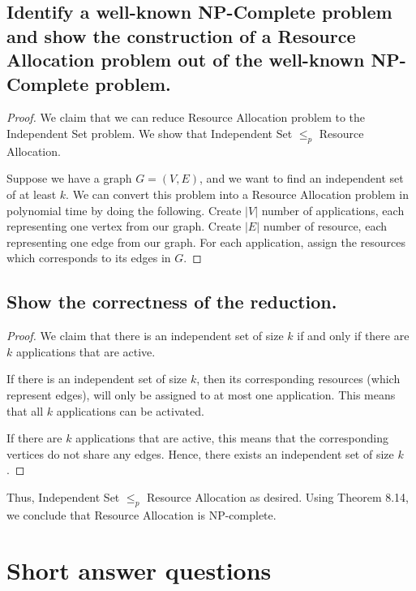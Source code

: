 \documentclass[11pt]{scrartcl}
\begin{document}
\subsection{
	Identify a well-known NP-Complete problem and show the construction of a
	Resource Allocation problem out of the well-known NP-Complete problem.
}
\begin{proof}
	We claim that we can reduce Resource Allocation problem to the Independent Set problem.
	We show that Independent Set $\leq_p$ Resource Allocation.

	Suppose we have a graph $G=(V,E)$, and we want to find an independent set of at least $k$.
	We can convert this problem into a Resource Allocation problem in polynomial time by doing the following.
	Create $|V|$ number of applications, each representing one vertex from our graph. 
	Create $|E|$ number of resource, each representing one edge from our graph. 
	For each application, assign the resources which corresponds to its edges in $G$. 
	
\end{proof}

\subsection{
	Show the correctness of the reduction.
}
\begin{proof}
	We claim that there is an independent set of size $k$ if and only if there are $k$ applications that are active. 

	If there is an independent set of size $k$, then its corresponding resources (which represent edges), will only be 
	assigned to at most one application. This means that all $k$ applications can be activated. 

	If there are $k$ applications that are active, this means that the corresponding vertices do not share any edges. 
	Hence, there exists an independent set of size $k$. 
\end{proof}

Thus, Independent Set $\leq_p$ Resource Allocation as desired.
Using Theorem 8.14, we conclude that Resource Allocation is NP-complete.


\pagebreak

\section{Short answer questions}
\end{document}

